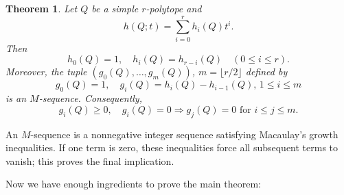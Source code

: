 \documentclass[12pt]{amsart}
\newtheorem{theorem}{Theorem}
\numberwithin{equation}{section}
\numberwithin{theorem}{section}
\begin{document}
\begin{theorem}
  \label{thm-g-theorem}
  Let $Q$ be a simple $r$-polytope and
  \begin{equation}
    h(Q;t)=\sum_{i=0}^r h_i(Q)t^i.
  \end{equation}
  Then 
  \begin{equation*}
      h_0(Q)=1,\quad h_i(Q)=h_{r-i}(Q)\quad (0\leq i\leq r).
  \end{equation*}
  Moreover, the tuple $(g_0(Q),\dots,g_m(Q))$, $m=\lfloor r/2\rfloor$ defined by
  \begin{equation*}
    g_0(Q)=1,\quad g_i(Q)=h_i(Q)-h_{i-1}(Q), \,1\leq i\leq m
  \end{equation*}
  is an $M$-sequence. Consequently,
  \begin{equation}
    g_i(Q)\geq 0,\quad g_i(Q)=0 \Longrightarrow g_j(Q)=0\text{  for  } i\leq j\leq m.
  \end{equation}
\end{theorem}
An $M$-sequence is a nonnegative integer sequence satisfying Macaulay's growth inequalities. If one term is zero, these inequalities force all subsequent terms to vanish; this proves the final implication.

Now we have enough ingredients to prove the main theorem:
\end{document}
